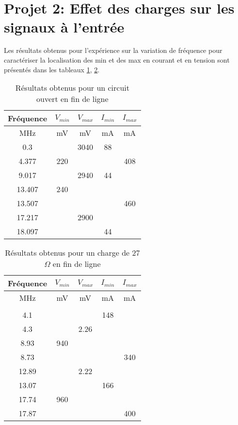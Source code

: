 \section{Projet 2: Effet des charges sur les signaux à l'entrée}
Les résultats obtenus pour l'expérience sur la variation de fréquence pour caractériser la localisation des min et des max en courant et en tension sont présentés dans les tableaux \ref{tab:1}, \ref{tab:2}.
\begin{table}[htbp]
  \centering
    \begin{tabular}{|c|c|c|c|c|}\hline
    Fréquence & $V_{min}$ & $V_{max}$ & $I_{min}$ & $I_{max}$ \\\hline
    MHz   & mV    & mV    & mA    & mA \\\hline
    0.3   &       & 3040  & 88    &  \\
    4.377 & 220   &       &       & 408 \\
    9.017 &       & 2940  & 44    &  \\
    13.407 & 240   &       &       &  \\
    13.507 &       &       &       & 460 \\
    17.217 &       & 2900  &       &  \\
    18.097 &       &       & 44    &  \\\hline
    \end{tabular}%
      \caption{Résultats obtenus pour un circuit ouvert en fin de ligne}
  \label{tab:1}%
\end{table}%

\begin{table}[htbp]
  \centering
    \begin{tabular}{|c|c|c|c|c|}\hline
    Fréquence & $V_{min}$ & $V_{max}$ & $I_{min}$ & $I_{max}$ \\\hline
    MHz   & mV    & mV    & mA    & mA \\\hline
          &       &       &       &  \\
    4.1   &       &       & 148   &  \\
    4.3   &       & 2.26  &       &  \\
    8.93  & 940   &       &       &  \\
    8.73  &       &       &       & 340 \\
    12.89 &       & 2.22  &       &  \\
    13.07 &       &       & 166   &  \\
    17.74 & 960   &       &       &  \\
    17.87 &       &       &       & 400 \\\hline
    \end{tabular}%
  \caption{Résultats obtenus pour un charge de 27$\Omega$ en fin de ligne}
  \label{tab:2}%
\end{table}%
